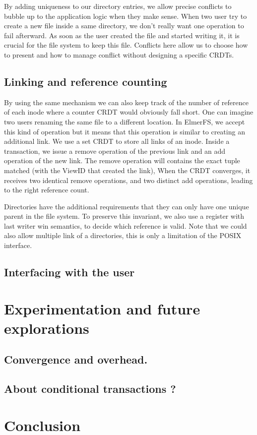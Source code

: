 \documentclass[sigplan, 10pt]{acmart}
\begin{document}
By adding uniqueness to our directory entries, we allow precise conflicts to bubble up to the application logic when they make sense.
When two user try to create a new file inside a same directory, we don't
really want one operation to fail afterward. As soon as the user created the
file and started writing it, it is crucial for the file system to keep this
file. Conflicts here allow us to choose how to present and how to manage
conflict without designing a specific CRDTs.

\subsection{Linking and reference counting}

By using the same mechanism we can also keep track of the number of reference
of each inode where a counter CRDT would obviously fall short. One can imagine two users
renaming the same file to a different location. In ElmerFS, we accept this kind
of operation but it means that this operation is similar to creating an additional link. We use a set CRDT to store all links of an inode. Inside a transaction,
we issue a remove operation of the previous link and an add operation of the new link. The remove operation will contains the exact tuple matched
(with the ViewID that created the link), When the CRDT converges, it receives
two identical remove operations, and two distinct add operations, leading to the right reference count.

Directories have the additional requirements that they can only have one unique
parent in the file system. To preserve this invariant, we also use a register
with last writer win semantics, to decide which reference is valid. Note that
we could also allow multiple link of a directories,
this is only a limitation of the POSIX interface.

\subsection{Interfacing with the user}

\section{Experimentation and future explorations}

\subsection{Convergence and overhead.}
\subsection{About conditional transactions ?}

\section{Conclusion}
\end{document}
